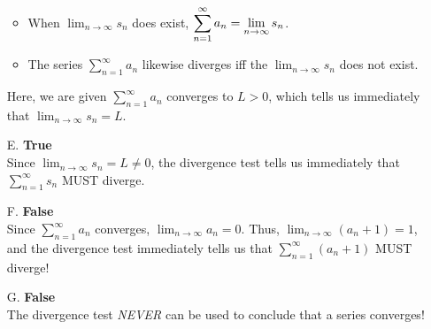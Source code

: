 \documentclass[noinstructornotes]{ximera}
\begin{document}
\begin{problem}
\begin{freeResponse}
\begin{itemize}
\begin{itemize}
\item When $\displaystyle \lim_{n\rightarrow \infty} s_n$ does exist, $\displaystyle \displaystyle \sum^{\infty}_{n= 1} a_n = \lim_{n \rightarrow \infty} s_n$.  


\item The series $\displaystyle \sum^{\infty}_{n= 1} a_n$ likewise diverges iff the $\displaystyle \lim_{n\rightarrow \infty} s_n$ does not exist.
\end{itemize}
Here, we are given $\displaystyle \sum^{\infty}_{n= 1} a_n$ converges to $L>0$, which tells us immediately that $\displaystyle \lim_{n\rightarrow \infty} s_n = L$.


\item[E.] \textbf{True} \\ Since $\displaystyle \lim_{n\rightarrow \infty} s_n = L \neq 0$, the divergence test tells us immediately that $\displaystyle \sum^{\infty}_{n=1} s_n$ MUST diverge.

\item[F.] \textbf{False} \\ Since $\displaystyle \sum^{\infty}_{n=1} a_n$ converges, $\displaystyle \lim_{n \rightarrow \infty} a_n = 0$.  Thus, $\displaystyle \lim_{n \rightarrow \infty} (a_n+1) = 1$, and the divergence test immediately tells us that  $\displaystyle \sum^{\infty}_{n=1} (a_n+1)$ MUST diverge!

\item[G.] \textbf{False} \\ The divergence test \emph{NEVER} can be used to conclude that a series converges! 

\vspace{3mm}


\end{itemize}
\end{freeResponse}
\end{problem}
\end{document}
